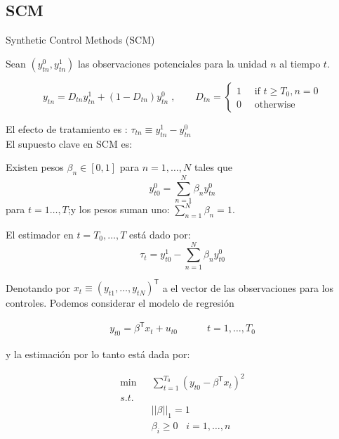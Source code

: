 \documentclass[8pt]{beamer}
\begin{document}
\subsection{SCM}
\begin{frame}[allowframebreaks]{Synthetic Control Methods (SCM)}

Sean $(y_{tn}^0, y_{tn}^1)$ las observaciones potenciales para la unidad $n$ al tiempo $t$.

\[y_{tn}=D_{tn}y_{tn}^1+(1-D_{tn})y_{tn}^0 \;,\quad\quad D_{tn}=\begin{cases}
1\quad \text{ if } t\geq T_0, n=0\\
0\quad\text{ otherwise }
\end{cases}
\]

El efecto de tratamiento es :  $\tau_{tn}\equiv y_{tn}^1-y_{tn}^0$ \\


El supuesto clave en SCM es:

\begin{block}{}
Existen pesos $\beta_n\in[0,1]$ para $n=1,\ldots, N$ tales que
\[y_{t0}^0=\sum_{n=1}^N\beta_{n}y_{tn}^0\]
para $t=1\ldots, T$;y los pesos suman uno: $\sum_{n=1}^{N}\beta_n=1$.
\end{block}

El estimador en $t=T_0,\ldots, T$ está dado por:
\[\tau_t=y_{t0}^1-\sum_{n=1}^N\beta_{n}y_{t0}^0\]

\framebreak

Denotando por $x_t\equiv (y_{t1},\ldots,y_{tN})^\mathsf{T}$ a el vector de las observaciones para los controles. Podemos considerar el modelo de regresión

\begin{align}
\label{reg_model}
    y_{t0}=\beta^{\mathsf{T}}x_t+u_{t0}\quad\quad\quad t=1,\ldots, T_0
\end{align}

y la estimación por lo tanto está dada por:

\begin{align}
\label{adh}
   \operatorname{min} & \sum_{t=1}^{T_0}(y_{t0}-\beta^{\mathsf{T}}x_t)^2\\
    s.t. \quad & \nonumber \\
    & ||\beta||_1=1 \nonumber \\
    &\beta_i\geq 0\;\;\; i=1,\ldots, n \nonumber
\end{align}


\end{frame}
\end{document}
